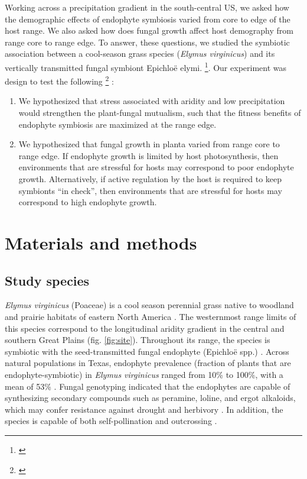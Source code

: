 \documentclass[11pt]{article}
\newcommand{\jacob}[2]{{\color{blue}{#1}}\footnote{\textit{\color{blue}{#2}}}}
\begin{document}
Working across a precipitation gradient in the south-central US, we asked how the demographic effects of endophyte symbiosis varied from core to edge of the host range.
We also asked how does fungal growth affect host demography from range core to range edge. 
To answer, these questions, we studied the symbiotic association between a cool-season grass species (\emph{Elymus virginicus}) and its vertically transmitted fungal symbiont Epichloë elymi. \jacob{[Describe ecology and natural history of grass-endophyte interactions]}{I am not sure If we need this}.
Our experiment was design to test the following \jacob{hypotheses}{ I need to update these hypotheses by adding the herbivory effect} :
\begin{enumerate}
\item We hypothesized that stress associated with aridity and low precipitation would strengthen the plant-fungal mutualism, such that the fitness benefits of endophyte symbiosis are maximized at the range edge. 
\item We hypothesized that fungal growth in planta varied from range core to range edge. If endophyte growth is limited by host photosynthesis, then environments that are stressful for hosts may correspond to poor endophyte growth. Alternatively, if active regulation by the host is required to keep symbionts “in check”, then environments that are stressful for hosts may correspond to high endophyte growth.
\end{enumerate}

\section*{Materials and methods}
\subsection*{Study species}
\emph {Elymus virginicus} (Poaceae) is a cool season perennial grass native to woodland and prairie habitats of eastern North America \citep{shaw2011guide}. 
The westernmost range limits of this species correspond to the longitudinal aridity gradient in the central and southern Great Plains (fig. \ref{fig:site}). 
Throughout its range, the species is  symbiotic with the seed-transmitted fungal endophyte (Epichloë spp.) \citep{rudgers2009benefits}. 
Across natural populations in Texas, endophyte prevalence (fraction of plants that are endophyte-symbiotic) in \emph {Elymus virginicus}  ranged from 10\% to 100\%, with a mean of 53\% \citep{sneck2017variation}. 
Fungal genotyping indicated that the endophytes are capable of synthesizing secondary compounds such as peramine, loline, and ergot alkaloids, which may confer resistance against drought and herbivory \citep{beaudry1951seed}.
In addition, the species is capable of both self-pollination and outcrossing \citep{church1958artificial}. 
\end{document}
